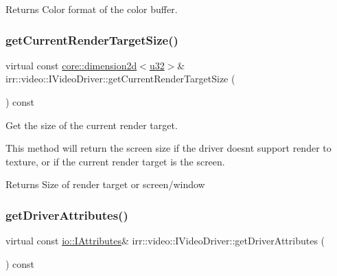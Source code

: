 \begin{DoxyReturn}{Returns}
Color format of the color buffer. 
\end{DoxyReturn}
\mbox{\label{classirr_1_1video_1_1IVideoDriver_a76fc2aba131b5986d07d92c6888cfc0c}} 
\subsubsection{\texorpdfstring{get\+Current\+Render\+Target\+Size()}{getCurrentRenderTargetSize()}}
{\footnotesize\ttfamily virtual const \hyperlink{classirr_1_1core_1_1dimension2d}{core\+::dimension2d}$<$\hyperlink{namespaceirr_a0416a53257075833e7002efd0a18e804}{u32}$>$\& irr\+::video\+::\+I\+Video\+Driver\+::get\+Current\+Render\+Target\+Size (\begin{DoxyParamCaption}{ }\end{DoxyParamCaption}) const\hspace{0.3cm}{\ttfamily [pure virtual]}}



Get the size of the current render target. 

This method will return the screen size if the driver doesn\textquotesingle{}t support render to texture, or if the current render target is the screen. \begin{DoxyReturn}{Returns}
Size of render target or screen/window 
\end{DoxyReturn}
\mbox{\label{classirr_1_1video_1_1IVideoDriver_a2b43d2215f2e5aad9b4f92aa635bcc85}} 
\subsubsection{\texorpdfstring{get\+Driver\+Attributes()}{getDriverAttributes()}}
{\footnotesize\ttfamily virtual const \hyperlink{classirr_1_1io_1_1IAttributes}{io\+::\+I\+Attributes}\& irr\+::video\+::\+I\+Video\+Driver\+::get\+Driver\+Attributes (\begin{DoxyParamCaption}{ }\end{DoxyParamCaption}) const\hspace{0.3cm}{\ttfamily [pure virtual]}}



